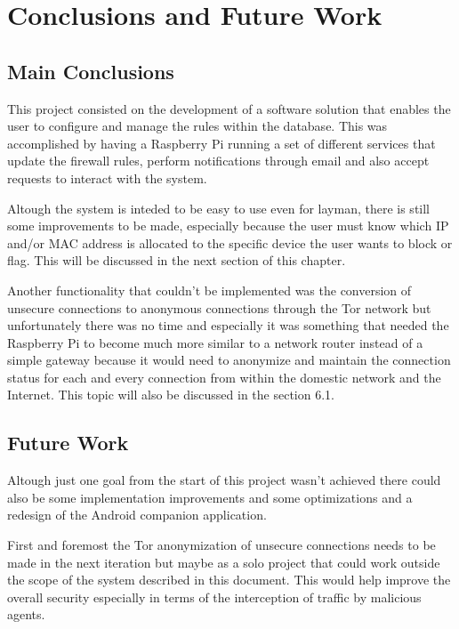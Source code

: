 \chapter{Conclusions and Future Work}
\label{chap:conc-future-work}

\section{Main Conclusions}
\label{sec:main-concs}

This project consisted on the development of a software solution that enables
the user to configure and manage the rules within the database. This was
accomplished by having a Raspberry Pi running a set of different services that
update the firewall rules, perform notifications through email and also accept
requests to interact with the system.

Altough the system is inteded to be easy to use even for layman, there is still
some improvements to be made, especially because the user must know which IP
and/or MAC address is allocated to the specific device the user wants to block
or flag. This will be discussed in the next section of this chapter.

Another functionality that couldn't be implemented was the conversion of
unsecure connections to anonymous connections through the Tor network but
unfortunately there was no time and especially it was something that needed the
Raspberry Pi to become much more similar to a network router instead of a simple
gateway because it would need to anonymize and maintain the connection status
for each and every connection from within the domestic network and the Internet.
This topic will also be discussed in the section 6.1.

\section{Future Work}
\label{sec:future-work}

Altough just one goal from the start of this project wasn't achieved there could
also be some implementation improvements and some optimizations and a redesign
of the Android companion application.

First and foremost the Tor anonymization of unsecure connections needs to be
made in the next iteration but maybe as a solo project that could work outside
the scope of the system described in this document. This would help improve the
overall security especially in terms of the interception of traffic by malicious
agents.

